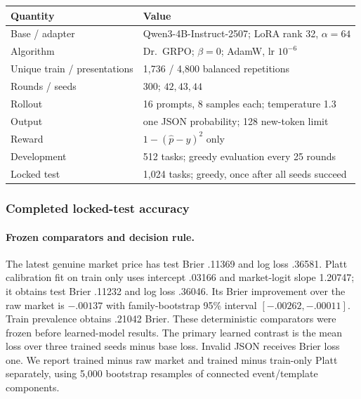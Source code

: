 \begin{center}
\begin{minipage}{\linewidth}
\centering
{}
\label{tab:exp3b-hparams}
\scriptsize
\begin{tabular}{p{.34\linewidth}p{.59\linewidth}}
\toprule
\textbf{Quantity} & \textbf{Value} \\
\midrule
Base / adapter & Qwen3-4B-Instruct-2507; LoRA rank 32, $\alpha=64$ \\
Algorithm & Dr.~GRPO; $\beta=0$; AdamW, lr $10^{-6}$ \\
Unique train / presentations & 1,736 / 4,800 balanced repetitions \\
Rounds / seeds & 300; $42,43,44$ \\
Rollout & 16 prompts, 8 samples each; temperature 1.3 \\
Output & one JSON probability; 128 new-token limit \\
Reward & $1-(\hat p-y)^2$ only \\
Development & 512 tasks; greedy evaluation every 25 rounds \\
Locked test & 1,024 tasks; greedy, once after all seeds succeed \\
\bottomrule
\end{tabular}
\end{minipage}
\end{center}

\subsubsection{Completed locked-test accuracy}
\label{app:exp3b-results}
\paragraph{Frozen comparators and decision rule.}
The latest genuine market price has test Brier .11369 and log loss .36581. Platt
calibration fit on train only uses intercept .03166 and market-logit slope 1.20747;
it obtains test Brier .11232 and log loss .36046. Its Brier improvement over the
raw market is $-.00137$ with family-bootstrap 95\% interval
$[-.00262,-.00011]$. Train prevalence obtains .21042 Brier. These deterministic
comparators were frozen before learned-model results. The primary learned
contrast is the mean loss over three trained seeds minus base loss. Invalid JSON
receives Brier loss one. We report trained minus raw market and trained minus
train-only Platt separately, using 5,000 bootstrap resamples of connected
event/template components.

